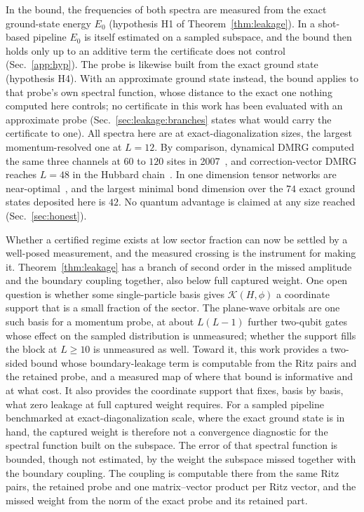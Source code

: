 In the bound, the frequencies of both spectra are measured from the exact ground-state energy $E_0$
(hypothesis H1 of Theorem~\ref{thm:leakage}). In a shot-based pipeline $E_0$ is itself estimated on
a sampled subspace, and the bound then holds only up to an additive term the certificate does not
%
%
control (Sec.~\ref{app:hyp}). The probe is likewise built from the exact ground state (hypothesis H4).
With an approximate ground state instead, the bound applies to that probe's own spectral function,
whose distance to the exact one nothing computed here controls; no certificate in this work has been
evaluated with an approximate probe (Sec.~\ref{sec:leakage:branches} states what would carry the
certificate to one). All spectra
here are at exact-diagonalization sizes, the largest momentum-resolved one at $L=12$. By comparison,
dynamical DMRG computed the same three channels at $60$ to $120$ sites in 2007~\cite{benthien2007},
and correction-vector DMRG reaches $L=48$ in the Hubbard chain~\cite{nocera2016}. In one dimension
tensor networks are near-optimal~\cite{whitedmrg1992,schollwock2011}, and the largest minimal bond dimension over the
$74$ exact ground states deposited here is $42$. No quantum advantage is claimed at any size reached
(Sec.~\ref{sec:honest}).

Whether a certified regime exists at low sector fraction can now be settled by a well-posed
measurement, and the measured crossing is the instrument for making it. Theorem~\ref{thm:leakage} has a
branch of second order in the missed amplitude and the boundary coupling together, also below full captured
weight. One open question is whether some
single-particle basis gives $\mathcal K(H,\phi)$ a coordinate support that is a small fraction of
the sector. The plane-wave orbitals are one such basis for a momentum probe, at about $L(L-1)$
further two-qubit gates whose effect on the sampled distribution is unmeasured; whether the support
fills the block at $L\ge10$ is unmeasured as well. Toward it, this work provides a two-sided bound
whose boundary-leakage term is computable from the Ritz pairs and the retained probe, and a measured
map of where that bound is informative and at what cost. It also provides the coordinate support
that fixes, basis by basis, what zero leakage at full captured weight requires. For a sampled
pipeline benchmarked at exact-diagonalization scale, where the exact ground state is in hand, the
captured weight is therefore not a convergence diagnostic for the spectral function built on the
subspace. The error of that spectral function is bounded, though not estimated, by the weight the
subspace missed together with the boundary coupling. The coupling is computable there from the same
Ritz pairs, the retained probe and one matrix--vector product per Ritz vector, and the missed weight
from the norm of the exact probe and its retained part.

